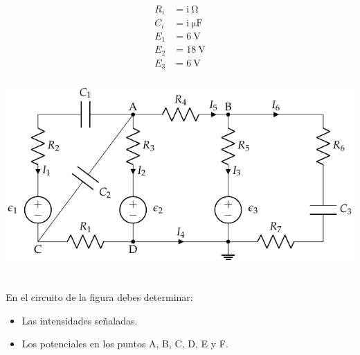 \documentclass[10pt]{article}
\begin{document}
\begin{minipage}[c]{0.3\textwidth}
  \begin{align*}
    R_i &= \mathrm{i\ } \si{\ohm}\\
    C_i &= \mathrm{i\ } \si{\micro\farad}\\
    E_1 &= \SI{6}{\volt}\\
    E_2 &= \SI{18}{\volt}\\
    E_3 &= \SI{6}{\volt}\\
  \end{align*}
\end{minipage}
\begin{minipage}[c]{0.7\textwidth}
  \includegraphics[width=\textwidth]{figs/nudos_condensadores.pdf}
\end{minipage}

\clearpage

\section{}

En el circuito de la figura debes determinar:
\begin{itemize}
\item Las intensidades señaladas.
\item Los potenciales en los puntos A, B, C, D, E y F.
\end{itemize}
\end{document}
